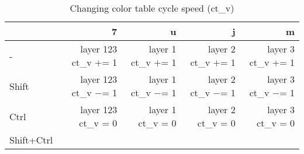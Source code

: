 \documentclass[10pt,a4paper]{article}
\begin{document}
\begin{table}[h!]
    \caption{Changing color table cycle speed (ct\_v)}
    \setlength{\tabcolsep}{0.0pt}
    \begin{tabularx}{\linewidth}{lRRRR}
        \toprule
                   & 7                      & u                    & j                    & m                    \\
        \midrule                                                                          
        -          & layer 123 ct\_v $+$= 1 & layer 1 ct\_v $+$= 1 & layer 2 ct\_v $+$= 1 & layer 3 ct\_v $+$= 1 \\
        Shift      & layer 123 ct\_v $-$= 1 & layer 1 ct\_v $-$= 1 & layer 2 ct\_v $-$= 1 & layer 3 ct\_v $-$= 1 \\
        Ctrl       & layer 123 ct\_v = 0    & layer 1 ct\_v = 0    & layer 2 ct\_v = 0    & layer 3 ct\_v = 0    \\
        Shift+Ctrl &                        &                      &                      &                      \\
        \bottomrule
    \end{tabularx}
\end{table}
\end{document}
